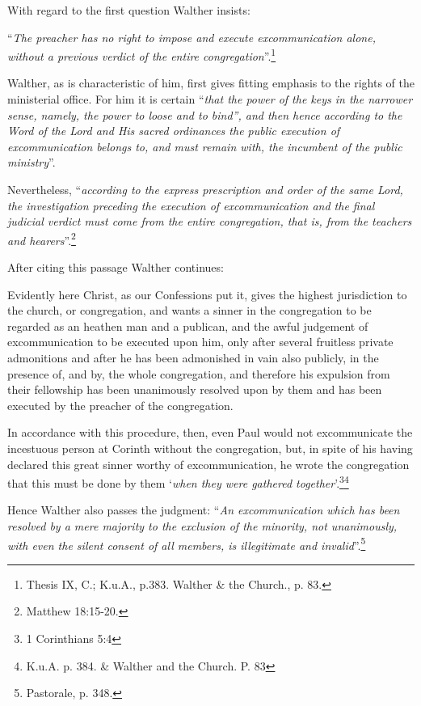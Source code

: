         With regard to the first question Walther insists: \begin{displayquote}“\textit{The preacher has no right to impose and execute excommunication alone, without a previous verdict of the entire congregation}”.\footnote{Thesis IX, C.; K.u.A., p.383. Walther & the Church., p. 83.}\end{displayquote}  Walther, as is characteristic of him, first gives fitting emphasis to the rights of the ministerial office.  For him it is certain “\textit{that the power of the keys in the narrower sense, namely, the power to loose and to bind”, and then hence according to the Word of the Lord and His sacred ordinances the public execution of excommunication belongs to, and must remain with, the incumbent of the public ministry}”.\par  Nevertheless, “\textit{according to the express prescription and order of the same Lord, the investigation preceding the execution of excommunication and the final judicial verdict must come from the entire congregation, that is, from the teachers and hearers}”.\footnote{Matthew 18:15-20.} \par  After citing this passage Walther continues: \begin{fancyquotes}Evidently here Christ, as our Confessions put it, gives the highest jurisdiction to the church, or congregation, and wants a sinner in the congregation to be regarded as an heathen man and a publican, and the awful judgement of excommunication to be executed upon him, only after several fruitless private admonitions and after he has been admonished in vain also publicly, in the presence of, and by, the whole congregation, and therefore his expulsion from their fellowship has been unanimously resolved upon by them and has been executed by the preacher of the congregation. \par In accordance with this procedure, then, even Paul would not excommunicate the incestuous person at Corinth without the congregation, but, in spite of his having declared this great sinner worthy of excommunication, he wrote the congregation that this must be done by them `\textit{when they were gathered together}’.\footnote{1 Corinthians 5:4}\footnote{K.u.A. p. 384. \& Walther and the Church. P. 83}\end{fancyquotes}  Hence Walther also passes the judgment: “\textit{An excommunication which has been resolved by a mere majority to the exclusion of the minority, not unanimously, with even the silent consent of all members, is illegitimate and invalid}”.\footnote{Pastorale, p. 348.}

